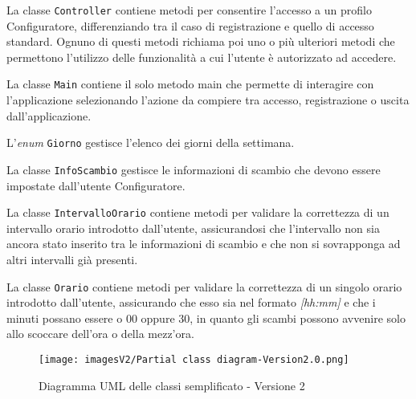 La classe \texttt{Controller} contiene metodi per consentire l'accesso a un profilo Configuratore, differenziando tra il caso di registrazione e quello di accesso standard. Ognuno di questi metodi richiama poi uno o più ulteriori metodi che permettono l'utilizzo delle funzionalità a cui l'utente è autorizzato ad accedere.

La classe \texttt{Main} contiene il solo metodo main che permette di interagire con l'applicazione selezionando l'azione da compiere tra accesso, registrazione o uscita dall'applicazione.

L'\textit{enum} \texttt{Giorno} gestisce l'elenco dei giorni della settimana.

La classe \texttt{InfoScambio} gestisce le informazioni di scambio che devono essere impostate dall'utente Configuratore.

La classe \texttt{IntervalloOrario} contiene metodi per validare la correttezza di un intervallo orario introdotto dall'utente, assicurandosi che l'intervallo non sia ancora stato inserito tra le informazioni di scambio e che non si sovrapponga ad altri intervalli già presenti.

La classe \texttt{Orario} contiene metodi per validare la correttezza di un singolo orario introdotto dall'utente, assicurando che esso sia nel formato \textit{[hh:mm]} e che i minuti possano essere o 00 oppure 30, in quanto gli scambi possono avvenire solo allo scoccare dell'ora o della mezz'ora.

\begin{figure}[h!]
    \centering
    \texttt{[image: imagesV2/Partial class diagram-Version2.0.png]}
    \caption{\label{fig:Simplified Class Diagram}Diagramma UML delle classi semplificato - Versione 2}
\end{figure}
\bigskip
